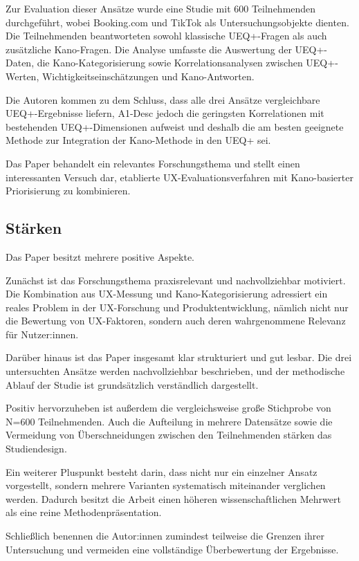\documentclass[12pt,DIV=14, version=first, BCOR=10mm,a4paper,twoside,parskip=half-,headsepline,headinclude]{scrartcl}
\begin{document}
Zur Evaluation dieser Ansätze wurde eine Studie mit 600 Teilnehmenden durchgeführt, wobei Booking.com und TikTok als Untersuchungsobjekte dienten. Die Teilnehmenden beantworteten sowohl klassische UEQ+-Fragen als auch zusätzliche Kano-Fragen. Die Analyse umfasste die Auswertung der UEQ+-Daten, die Kano-Kategorisierung sowie Korrelationsanalysen zwischen UEQ+-Werten, Wichtigkeitseinschätzungen und Kano-Antworten.

Die Autoren kommen zu dem Schluss, dass alle drei Ansätze vergleichbare UEQ+-Ergebnisse liefern, A1-Desc jedoch die geringsten Korrelationen mit bestehenden UEQ+-Dimensionen aufweist und deshalb die am besten geeignete Methode zur Integration der Kano-Methode in den UEQ+ sei.

Das Paper behandelt ein relevantes Forschungsthema und stellt einen interessanten Versuch dar, etablierte UX-Evaluationsverfahren mit Kano-basierter Priorisierung zu kombinieren.
\subsection{Stärken}

Das Paper besitzt mehrere positive Aspekte.

Zunächst ist das Forschungsthema praxisrelevant und nachvollziehbar motiviert. Die Kombination aus UX-Messung und Kano-Kategorisierung adressiert ein reales Problem in der UX-Forschung und Produktentwicklung, nämlich nicht nur die Bewertung von UX-Faktoren, sondern auch deren wahrgenommene Relevanz für Nutzer:innen.

Darüber hinaus ist das Paper insgesamt klar strukturiert und gut lesbar. Die drei untersuchten Ansätze werden nachvollziehbar beschrieben, und der methodische Ablauf der Studie ist grundsätzlich verständlich dargestellt.

Positiv hervorzuheben ist außerdem die vergleichsweise große Stichprobe von N=600 Teilnehmenden. Auch die Aufteilung in mehrere Datensätze sowie die Vermeidung von Überschneidungen zwischen den Teilnehmenden stärken das Studiendesign.

Ein weiterer Pluspunkt besteht darin, dass nicht nur ein einzelner Ansatz vorgestellt, sondern mehrere Varianten systematisch miteinander verglichen werden. Dadurch besitzt die Arbeit einen höheren wissenschaftlichen Mehrwert als eine reine Methodenpräsentation.

Schließlich benennen die Autor:innen zumindest teilweise die Grenzen ihrer Untersuchung und vermeiden eine vollständige Überbewertung der Ergebnisse.
\end{document}
